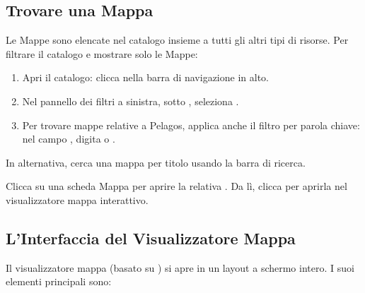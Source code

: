 \documentclass[letterpaper,10pt,english]{sphinxmanual}
\begin{document}
\subsection{Trovare una Mappa}
\label{\detokenize{it/04_esplorare_mappe:trovare-una-mappa}}
\sphinxAtStartPar
Le Mappe sono elencate nel catalogo insieme a tutti gli altri tipi di risorse.
Per filtrare il catalogo e mostrare solo le Mappe:
\begin{enumerate}
%
\item {} 
\sphinxAtStartPar
Apri il catalogo: clicca  nella barra di navigazione in alto.

\item {} 
\sphinxAtStartPar
Nel pannello dei filtri a sinistra, sotto , seleziona .

\item {} 
\sphinxAtStartPar
Per trovare mappe relative a Pelagos, applica anche il filtro per parola chiave:
nel campo , digita  o .

\end{enumerate}

\sphinxAtStartPar
In alternativa, cerca una mappa per titolo usando la barra di ricerca.

\sphinxAtStartPar
Clicca su una scheda Mappa per aprire la relativa . Da lì,
clicca  per aprirla nel visualizzatore mappa interattivo.


\subsection{L’Interfaccia del Visualizzatore Mappa}
\label{\detokenize{it/04_esplorare_mappe:l-interfaccia-del-visualizzatore-mappa}}
\sphinxAtStartPar
Il visualizzatore mappa (basato su ) si apre in un layout a schermo intero.
I suoi elementi principali sono:
\end{document}
